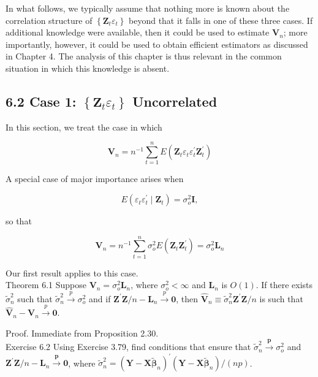 \documentclass[10pt]{article}
\begin{document}
In what follows, we typically assume that nothing more is known about the correlation structure of $\left\{\mathbf{Z}_{t} \varepsilon_{t}\right\}$ beyond that it falls in one of these three cases. If additional knowledge were available, then it could be used to estimate $\mathbf{V}_{n}$; more importantly, however, it could be used to obtain efficient estimators as discussed in Chapter 4. The analysis of this chapter is thus relevant in the common situation in which this knowledge is absent.

\subsection*{6.2 Case 1: $\left\{\mathbf{Z}_{t} \varepsilon_{t}\right\}$ Uncorrelated}
In this section, we treat the case in which

$$
\mathbf{V}_{n}=n^{-1} \sum_{t=1}^{n} E\left(\mathbf{Z}_{t} \varepsilon_{t} \varepsilon_{t}^{\prime} \mathbf{Z}_{t}^{\prime}\right)
$$

A special case of major importance arises when

$$
E\left(\varepsilon_{t} \varepsilon_{t}^{\prime} \mid \mathbf{Z}_{t}\right)=\sigma_{o}^{2} \mathbf{I},
$$

so that

$$
\mathbf{V}_{n}=n^{-1} \sum_{t=1}^{n} \sigma_{o}^{2} E\left(\mathbf{Z}_{t} \mathbf{Z}_{t}^{\prime}\right)=\sigma_{o}^{2} \mathbf{L}_{n}
$$

Our first result applies to this case.\\
Theorem 6.1 Suppose $\mathbf{V}_{n}=\sigma_{o}^{2} \mathbf{L}_{n}$, where $\sigma_{o}^{2}<\infty$ and $\mathbf{L}_{n}$ is $O(1)$. If there exists $\tilde{\sigma}_{n}^{2}$ such that $\tilde{\sigma}_{n}^{2} \xrightarrow{p} \sigma_{o}^{2}$ and if $\mathbf{Z}^{\prime} \mathbf{Z} / n-\mathbf{L}_{n} \xrightarrow{p} \mathbf{0}$, then $\hat{\mathbf{V}}_{n} \equiv \tilde{\sigma}_{n}^{2} \mathbf{Z}^{\prime} \mathbf{Z} / n$ is such that $\hat{\mathbf{V}}_{n}-\mathbf{V}_{n} \xrightarrow{p} \mathbf{0}$.

Proof. Immediate from Proposition 2.30.\\
Exercise 6.2 Using Exercise 3.79, find conditions that ensure that $\tilde{\sigma}_{n}^{2} \xrightarrow{\boldsymbol{p}} \sigma_{o}^{2}$ and $\mathbf{Z}^{\prime} \mathbf{Z} / n-\mathbf{L}_{n} \xrightarrow{\boldsymbol{p}} \mathbf{0}$, where $\tilde{\sigma}_{n}^{2}=\left(\mathbf{Y}-\mathbf{X} \tilde{\boldsymbol{\beta}}_{n}\right)^{\prime}\left(\mathbf{Y}-\mathbf{X} \tilde{\boldsymbol{\beta}}_{n}\right) /(n p)$.
\end{document}
